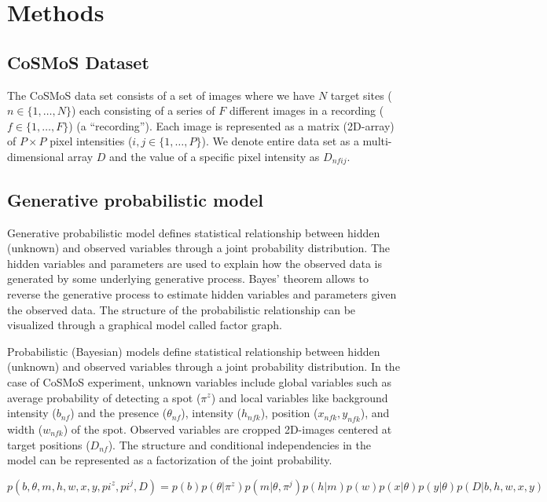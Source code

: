 \section{Methods}

\subsection{CoSMoS Dataset}

The CoSMoS data set consists of a set of images where we have $N$ target sites ($n \in \{1,\dots,N\}$) each consisting of a series of $F$ different images in a recording ($f \in \{1,\dots,F\}$) (a “recording”). Each image is represented as a matrix (2D-array) of $P \times P$ pixel intensities ($i,j \in \{1,\dots,P\}$). We denote entire data set as a multi-dimensional array $D$ and the value of a specific pixel intensity as $D_{nfij}$.

\subsection{Generative probabilistic model}

Generative probabilistic model defines statistical relationship between hidden (unknown) and observed variables through a joint probability distribution. The hidden variables and parameters are used to explain how the observed data is generated by some underlying generative process. Bayes' theorem allows to reverse the generative process to estimate hidden variables and parameters given the observed data. The structure of the probabilistic relationship can be visualized through a graphical model called factor graph. 

Probabilistic (Bayesian) models define statistical relationship between hidden (unknown) and observed variables through a joint probability distribution. In the case of CoSMoS experiment, unknown variables include global variables such as average probability of detecting a spot ($\pi^z$) and local variables like background intensity ($b_{nf}$) and the presence ($\theta_{nf}$), intensity ($h_{nfk}$), position ($x_{nfk}, y_{nfk}$), and width ($w_{nfk}$) of the spot. Observed variables are cropped 2D-images centered at target positions ($D_{nf}$). The structure and conditional independencies in the model can be represented as a factorization of the joint probability.

\textbf{\begin{equation*}
    p(b,\theta,m,h,w,x,y,pi^z,pi^j,D) = p(b)p(\theta|\pi^z)p(m|\theta,\pi^j)p(h|m)p(w)p(x|\theta)p(y|\theta)p(D|b,h,w,x,y)
\end{equation*}}

